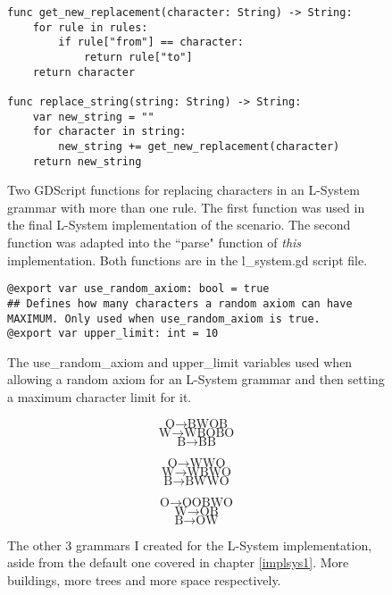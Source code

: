 \begin{figure}[H]
    \centering
    \begin{lstlisting}
func get_new_replacement(character: String) -> String:
	for rule in rules:
		if rule["from"] == character:
			return rule["to"]
	return character

func replace_string(string: String) -> String:
	var new_string = ""
	for character in string:
		new_string += get_new_replacement(character)
	return new_string
    \end{lstlisting}
    \caption{Two GDScript functions for replacing characters in an L-System grammar with more than one rule. The first function was used in the final L-System implementation of the scenario. The second function was adapted into the ``parse" function of \emph{this} implementation. Both functions are in the l\_system.gd script file.}
    \label{fig:lsystem2}
\end{figure}

\begin{figure}[H]
    \centering
    \begin{lstlisting}
@export var use_random_axiom: bool = true
## Defines how many characters a random axiom can have MAXIMUM. Only used when use_random_axiom is true.
@export var upper_limit: int = 10
    \end{lstlisting}
    \caption{The use\_random\_axiom and upper\_limit variables used when allowing a random axiom for an L-System grammar and then setting a maximum character limit for it.}
    \label{fig:lsystem3}
\end{figure}

\begin{figure}[H]
    \centering
    $$ \mbox{O} \rightarrow \mbox{B}\mbox{W}\mbox{O}\mbox{B} $$
    $$ \mbox{W} \rightarrow \mbox{W}\mbox{B}\mbox{O}\mbox{B}\mbox{O} $$
    $$ \mbox{B} \rightarrow \mbox{B}\mbox{B} $$
    
    $$ \mbox{O} \rightarrow \mbox{W}\mbox{W}\mbox{O} $$ 
    $$ \mbox{W} \rightarrow \mbox{W}\mbox{B}\mbox{W}\mbox{O} $$
    $$ \mbox{B} \rightarrow \mbox{B}\mbox{W}\mbox{W}\mbox{O} $$
    
    $$ \mbox{O} \rightarrow \mbox{O}\mbox{O}\mbox{B}\mbox{W}\mbox{O} $$ 
    $$ \mbox{W} \rightarrow \mbox{O}\mbox{B} $$
    $$ \mbox{B} \rightarrow \mbox{O}\mbox{W} $$
    \caption{The other 3 grammars I created for the L-System implementation, aside from the default one covered in chapter \ref{implsys1}. More buildings, more trees and more space respectively.}
    \label{fig:lsystem4}
\end{figure}

